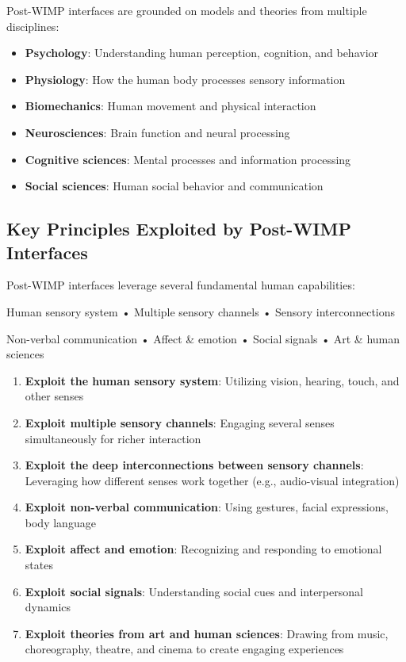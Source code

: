 \documentclass[11pt,a4paper]{article}
\theoremstyle{definition}
\theoremstyle{plain}
\theoremstyle{remark}
\begin{document}
Post-WIMP interfaces are grounded on models and theories from multiple disciplines:

\begin{itemize}
    \item \textbf{Psychology}: Understanding human perception, cognition, and behavior
    \item \textbf{Physiology}: How the human body processes sensory information
    \item \textbf{Biomechanics}: Human movement and physical interaction
    \item \textbf{Neurosciences}: Brain function and neural processing
    \item \textbf{Cognitive sciences}: Mental processes and information processing
    \item \textbf{Social sciences}: Human social behavior and communication
\end{itemize}

\subsection{Key Principles Exploited by Post-WIMP Interfaces}

Post-WIMP interfaces leverage several fundamental human capabilities:

\begin{tcolorbox}[colback=yellow!10!white,colframe=yellow!75!black,title=\textbf{7 Key Principles}]
Human sensory system • Multiple sensory channels • Sensory interconnections

Non-verbal communication • Affect \& emotion • Social signals • Art \& human sciences
\end{tcolorbox}

\begin{enumerate}
    \item \textbf{Exploit the human sensory system}: Utilizing vision, hearing, touch, and other senses
    
    \item \textbf{Exploit multiple sensory channels}: Engaging several senses simultaneously for richer interaction
    
    \item \textbf{Exploit the deep interconnections between sensory channels}: Leveraging how different senses work together (e.g., audio-visual integration)
    
    \item \textbf{Exploit non-verbal communication}: Using gestures, facial expressions, body language
    
    \item \textbf{Exploit affect and emotion}: Recognizing and responding to emotional states
    
    \item \textbf{Exploit social signals}: Understanding social cues and interpersonal dynamics
    
    \item \textbf{Exploit theories from art and human sciences}: Drawing from music, choreography, theatre, and cinema to create engaging experiences
\end{enumerate}
\end{document}
